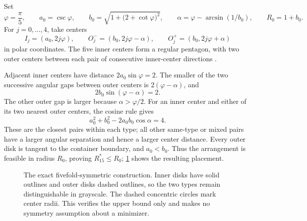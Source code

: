 \documentclass[11pt]{article}
\theoremstyle{definition}
\begin{document}
Set
\[
 \varphi=\frac\pi5,\qquad a_0=\csc\varphi,\qquad
 b_0=\sqrt{1+\bigl(2+\cot\varphi\bigr)^2},\qquad
 \alpha=\varphi-\arcsin(1/b_0),\qquad R_0=1+b_0.
\]
For $j=0,\ldots,4$, take centers
\[
 I_j=(a_0,2j\varphi),\qquad
 O_j^-=(b_0,2j\varphi-\alpha),\qquad
 O_j^+=(b_0,2j\varphi+\alpha)
\]
in polar coordinates. The five inner centers form a regular pentagon, with two outer centers between each pair of consecutive inner-center directions \cite{Packomania}.

Adjacent inner centers have distance $2a_0\sin\varphi=2$. The smaller of the two successive angular gaps between outer centers is $2(\varphi-\alpha)$, and
\[
 2b_0\sin(\varphi-\alpha)=2.
\]
The other outer gap is larger because $\alpha>\varphi/2$. For an inner center and either of its two nearest outer centers, the cosine rule gives
\[
 a_0^2+b_0^2-2a_0b_0\cos\alpha=4.
\]
These are the closest pairs within each type; all other same-type or mixed pairs have a larger angular separation and hence a larger center distance. Every outer disk is tangent to the container boundary, and $a_0<b_0$. Thus the arrangement is feasible in radius $R_0$, proving $R_{15}^*\le R_0$; \cref{fig:construction} shows the resulting placement.

\begin{figure}[htbp]
\centering
{}
\caption{The exact fivefold-symmetric construction. Inner disks have solid outlines and outer disks dashed outlines, so the two types remain distinguishable in grayscale. The dashed concentric circles mark center radii. This verifies the upper bound only and makes no symmetry assumption about a minimizer.}
\label{fig:construction}
\end{figure}
\end{document}
